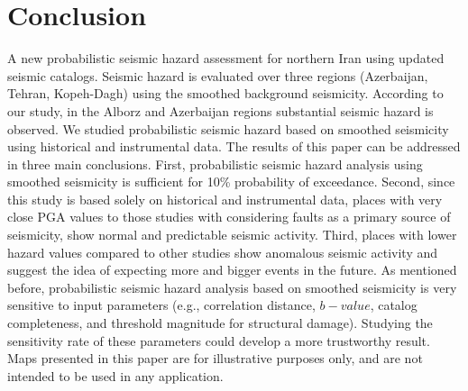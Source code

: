 \section{Conclusion}

A new probabilistic seismic hazard assessment for northern Iran using updated seismic catalogs. Seismic hazard is evaluated over three regions (Azerbaijan, Tehran, Kopeh-Dagh) using the smoothed background seismicity. According to our study, in the Alborz  and Azerbaijan regions substantial seismic hazard is observed.  We studied probabilistic seismic hazard based on smoothed seismicity using historical and instrumental data. The results of this paper can be addressed in three main conclusions. First, probabilistic seismic hazard analysis using smoothed seismicity is sufficient for 10\% probability of exceedance. Second, since this study is based solely on historical and instrumental data, places with very close PGA values to those studies with considering faults as a primary source of seismicity, show normal and predictable seismic activity. Third, places with lower hazard values compared to other studies show anomalous seismic activity and suggest the idea of expecting more and bigger events in the future. As mentioned before, probabilistic seismic hazard analysis based on smoothed seismicity is very sensitive to input parameters (e.g., correlation distance, $b-value$, catalog completeness, and threshold magnitude for structural damage). Studying the sensitivity rate of these parameters could develop a more trustworthy result. Maps presented in this paper are for illustrative purposes only, and are not intended to be used in any application. 
